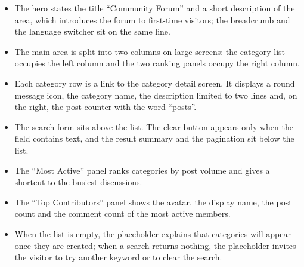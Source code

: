 \begin{itemize}[leftmargin=1.6em,topsep=3pt,itemsep=2pt,parsep=0pt,label=$\bullet$]
      \item The hero states the title ``Community Forum'' and a short description of the
            area, which introduces the forum to first-time visitors; the breadcrumb and the
            language switcher sit on the same line.
      \item The main area is split into two columns on large screens: the category list
            occupies the left column and the two ranking panels occupy the right column.
      \item Each category row is a link to the category detail screen. It displays a round
            message icon, the category name, the description limited to two lines and, on
            the right, the post counter with the word ``posts''.
      \item The search form sits above the list. The clear button appears only when the
            field contains text, and the result summary and the pagination sit below the
            list.
      \item The ``Most Active'' panel ranks categories by post volume and gives a shortcut
            to the busiest discussions.
      \item The ``Top Contributors'' panel shows the avatar, the display name, the post
            count and the comment count of the most active members.
      \item When the list is empty, the placeholder explains that categories will appear
            once they are created; when a search returns nothing, the placeholder invites
            the visitor to try another keyword or to clear the search.
\end{itemize}


